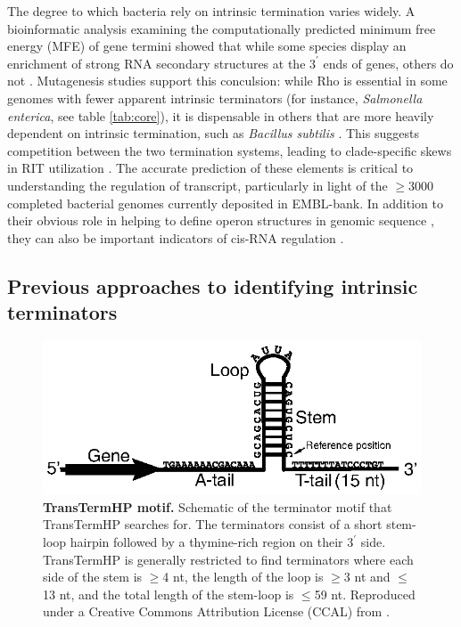 The degree to which bacteria rely on intrinsic termination varies widely. A bioinformatic analysis examining the computationally predicted minimum free energy (MFE) of gene termini showed that while some species display an enrichment of strong RNA secondary structures at the $3^\prime$ ends of genes, others do not \parencite{Washio1998}. Mutagenesis studies support this conculsion: while Rho is essential in some genomes with fewer apparent intrinsic terminators (for instance, \textit{Salmonella enterica}, see table \ref{tab:core}), it is dispensable in others that are more heavily dependent on intrinsic termination, such as \textit{Bacillus subtilis} \parencite{Quirk1993}. This suggests competition between the two termination systems, leading to clade-specific skews in RIT utilization \parencite{Carafa1990, Kroger1998, Hoon2005}. The accurate prediction of these elements is critical to understanding the regulation of transcript, particularly in light of the $\ge$3000 completed bacterial genomes currently deposited in EMBL-bank. In addition to their obvious role in helping to define operon structures in genomic sequence \parencite{Salgado2013}, they can also be important indicators of cis-RNA regulation \parencite{Henkin2002, Barrick2007, Naville2010}.

\subsection{Previous approaches to identifying intrinsic terminators}



\begin{figure}[htp]
\begin{center}
\includegraphics[width=14cm]{transterm}
\caption[TransTermHP motif]{\textbf{TransTermHP motif.} Schematic of the terminator motif that TransTermHP searches for. The terminators consist of a short stem-loop hairpin followed by a thymine-rich region on their $3^\prime$ side. TransTermHP is generally restricted to find terminators where each side of the stem is $\ge$4 nt, the length of the loop is $\ge$3 nt and $\le$13 nt, and the total length of the stem-loop is $\le$59 nt. Reproduced under a Creative Commons Attribution License (CCAL) from \textcite{Kingsford2007}.
} 
\label{fig:transterm}
\end{center}
\end{figure}
